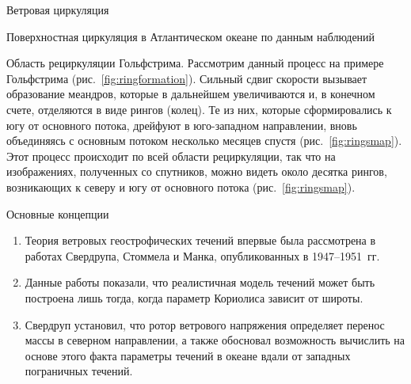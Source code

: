\begin{chapter}{Ветровая циркуляция}
\begin{section}{Поверхностная циркуляция в Атлантическом океане по данным наблюдений}
\begin{paragraph}{Область рециркуляции Гольфстрима.}
Рассмотрим данный процесс на примере Гольфстрима (рис.~\ref{fig:ringformation}). 
Сильный сдвиг скорости вызывает образование меандров, которые в дальнейшем
увеличиваются и, в конечном счете, отделяются в виде рингов (колец). 
Те из них, которые сформировались к югу от основного потока, дрейфуют 
в юго-западном направлении, вновь объединяясь с основным потоком несколько 
месяцев спустя (рис.~\ref{fig:ringsmap}). Этот процесс происходит по всей 
области рециркуляции, так что на изображениях, полученных со спутников, 
можно видеть около десятка рингов, возникающих к северу и югу от основного 
потока (рис.~\ref{fig:ringsmap}).
%
\end{paragraph}
\end{section}

\begin{section}{Основные концепции}
\begin{enumerate}
\item 
Теория ветровых геострофических 
течений впервые была 
рассмотрена в работах Свердрупа, Стоммела и Манка, опубликованных
в 1947--1951~гг.
%

\item 
Данные работы показали, что реалистичная модель течений может быть
построена лишь тогда, когда параметр Кориолиса
зависит от широты.
%

\item 
Свердруп установил, что ротор ветрового напряжения%
 определяет перенос массы в северном 
направлении, а также обосновал возможность
вычислить на основе этого факта параметры течений в океане вдали от западных
пограничных течений.
%


\end{enumerate}
\end{section}
\end{chapter}
